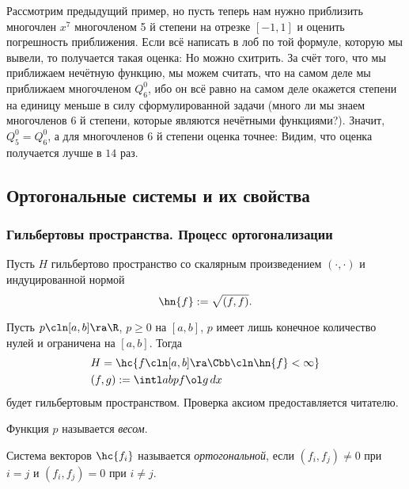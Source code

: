 \documentclass[a4paper]{article}
\begin{document}
\begin{ex}
Рассмотрим предыдущий пример, но пусть теперь нам нужно приблизить
многочлен $x^7$ многочленом 5 й степени на отрезке $[-1,1]$ и оценить
погрешность приближения. Если всё написать в лоб по той формуле,
которую мы вывели, то получается такая оценка:   Но можно
схитрить. За счёт того, что мы приближаем нечётную функцию, мы можем
считать, что на самом деле мы приближаем многочленом $Q_6^0$, ибо он
всё равно на самом деле окажется степени на единицу меньше в силу
сформулированной задачи (много ли мы знаем многочленов 6 й степени,
которые являются нечётными функциями?).  Значит, $Q_5^0 = Q_6^0$, а
для многочленов 6 й степени оценка точнее:   Видим, что
оценка получается лучше в $14$ раз.
\end{ex}


\subsection{Ортогональные системы и их свойства}

\subsubsection{Гильбертовы пространства. Процесс ортогонализации}

Пусть $H$ гильбертово пространство со скалярным произведением
$(\cdot,\cdot)$ и индуцированной нормой
$$\hn{f} := \sqrt{(f,f)}.$$

Пусть $p\cln [a,b] \ra \R$, $p \ge 0$ на $[a,b]$, $p$ имеет лишь
конечное количество нулей и ограничена на $[a,b]$. Тогда
$$
\begin{aligned}
&H = \hc{f \cln [a,b] \ra \Cbb\cln \hn{f} < \infty}\\ &(f,g) := \intl
  ab p f \ol g\, dx
\end{aligned}
$$ будет гильбертовым пространством. Проверка аксиом предоставляется
читателю.

\begin{df}
Функция $p$ называется \emph{весом}.
\end{df}

\begin{df}
Система векторов $\hc{f_i}$ называется \emph{ортогональной}, если
$(f_i,f_j) \neq 0$ при $i = j$ и $(f_i,f_j) = 0$ при $i \neq j$.
\end{df}
\end{document}
